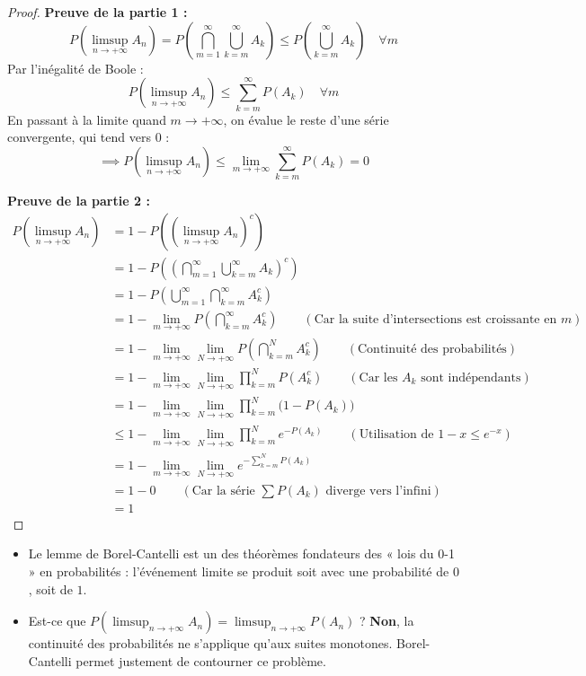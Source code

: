 \begin{proof}
    \textbf{Preuve de la partie 1 :}
    \[
    P\left(\limsup_{n \to +\infty} A_n\right) = P\left(\bigcap_{m=1}^{\infty}\bigcup_{k=m}^{\infty} A_k\right) \leq P\left(\bigcup_{k=m}^{\infty} A_k\right) \quad \forall m
    \]
    Par l'inégalité de Boole :
    \[
    P\left(\limsup_{n \to +\infty} A_n\right) \leq \sum_{k=m}^{\infty} P(A_k) \quad \forall m 
    \]
    En passant à la limite quand $m \to +\infty$, on évalue le reste d'une série convergente, qui tend vers $0$ :
    \[
    \implies P\left(\limsup_{n \to +\infty} A_n\right) \leq \lim_{m \to +\infty} \sum_{k=m}^{\infty} P(A_k) = 0
    \]
    
    \textbf{Preuve de la partie 2 :}
    \begin{align*}
    P\left(\limsup_{n \to +\infty} A_n\right)
    &= 1 - P\left(\left(\limsup_{n \to +\infty} A_n\right)^c\right) \\
    &= 1 - P\left(\left(\bigcap_{m=1}^{\infty}\bigcup_{k=m}^{\infty} A_k\right)^c\right) \\
    &= 1 - P\left(\bigcup_{m=1}^{\infty}\bigcap_{k=m}^{\infty} A_k^c\right) \\
    &= 1 - \lim_{m \to +\infty} P\left(\bigcap_{k=m}^{\infty} A_k^c\right) \qquad (\text{Car la suite d'intersections est croissante en } m) \\
    &= 1 - \lim_{m \to +\infty} \lim_{N \to +\infty} P\left(\bigcap_{k=m}^{N} A_k^c\right) \qquad (\text{Continuité des probabilités}) \\
    &= 1 - \lim_{m \to +\infty} \lim_{N \to +\infty} \prod_{k=m}^{N} P(A_k^c) \qquad (\text{Car les } A_k \text{ sont indépendants}) \\
    &= 1 - \lim_{m \to +\infty} \lim_{N \to +\infty} \prod_{k=m}^{N} \bigl(1 - P(A_k)\bigr) \\
    &\leq 1 - \lim_{m \to +\infty} \lim_{N \to +\infty} \prod_{k=m}^{N} e^{-P(A_k)} \qquad (\text{Utilisation de } 1-x \leq e^{-x}) \\
    &= 1 - \lim_{m \to +\infty} \lim_{N \to +\infty} e^{-\sum_{k=m}^{N} P(A_k)} \\
    &= 1 - 0 \qquad (\text{Car la série } \textstyle\sum P(A_k) \text{ diverge vers l'infini}) \\
    &= 1
    \end{align*}
\end{proof}

\begin{remarque}
\begin{itemize}
    \item Le lemme de Borel-Cantelli est un des théorèmes fondateurs des « lois du 0-1 » en probabilités : l'événement limite se produit soit avec une probabilité de $0$, soit de $1$.
    \item Est-ce que $P\left(\limsup_{n\to+\infty} A_n\right) = \limsup_{n\to+\infty} P(A_n)$ ? \textcolor{PropColor}{\textbf{Non}}, la continuité des probabilités ne s'applique qu'aux suites monotones. Borel-Cantelli permet justement de contourner ce problème.
\end{itemize}
\end{remarque}


